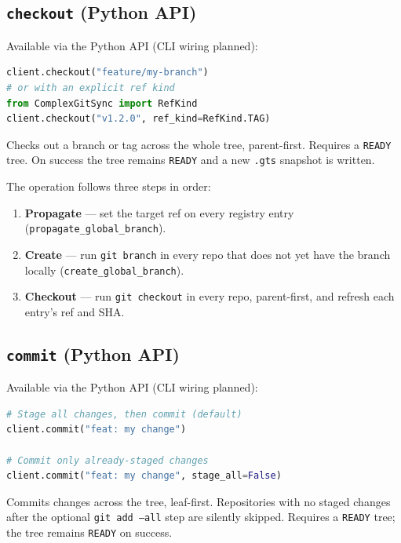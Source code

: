 \documentclass[11pt,a4paper]{article}
\begin{document}
\subsection{\texttt{checkout} (Python API)}

Available via the Python API (CLI wiring planned):

\begin{lstlisting}[language=Python]
client.checkout("feature/my-branch")
# or with an explicit ref kind
from ComplexGitSync import RefKind
client.checkout("v1.2.0", ref_kind=RefKind.TAG)
\end{lstlisting}

Checks out a branch or tag across the whole tree, parent-first.
Requires a \texttt{READY} tree.  On success the tree remains \texttt{READY}
and a new \texttt{.gts} snapshot is written.

The operation follows three steps in order:

\begin{enumerate}
  \item \textbf{Propagate} — set the target ref on every registry entry
    (\texttt{propagate\_global\_branch}).
  \item \textbf{Create} — run \texttt{git branch} in every repo that does not
    yet have the branch locally (\texttt{create\_global\_branch}).
  \item \textbf{Checkout} — run \texttt{git checkout} in every repo,
    parent-first, and refresh each entry's ref and SHA.
\end{enumerate}

\subsection{\texttt{commit} (Python API)}

Available via the Python API (CLI wiring planned):

\begin{lstlisting}[language=Python]
# Stage all changes, then commit (default)
client.commit("feat: my change")

# Commit only already-staged changes
client.commit("feat: my change", stage_all=False)
\end{lstlisting}

Commits changes across the tree, leaf-first.  Repositories with no staged
changes after the optional \texttt{git add --all} step are silently skipped.
Requires a \texttt{READY} tree; the tree remains \texttt{READY} on success.
\end{document}
